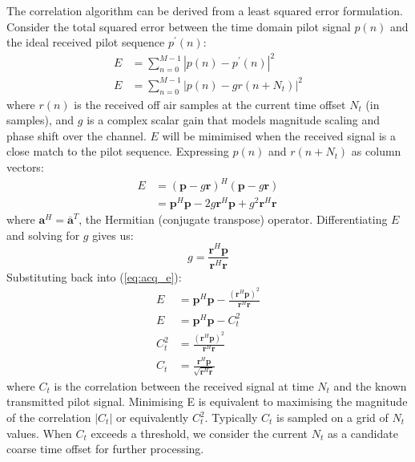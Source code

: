 \documentclass{article}
\begin{document}
The correlation algorithm can be derived from a least squared error formulation.  Consider the total squared error between the time domain pilot signal $p(n)$ and the ideal received pilot sequence $p^\prime(n)$:
\begin{equation}
\begin{split}
E &= \sum^{M-1}_{n=0} | p(n) - p^\prime(n) |^2 \\
E &= \sum^{M-1}_{n=0} | p(n) - gr(n+N_t)|^2
\end{split}
\end{equation}
where $r(n)$ is the received off air samples at the current time offset $N_{t}$  (in samples), and $g$ is a complex scalar gain that models magnitude scaling and phase shift over the channel.  $E$ will be mimimised when the received signal is a close match to the pilot sequence. Expressing $p(n)$ and $r(n+N_t)$ as column vectors:
\begin{equation}
\label{eq:acq_e}
\begin{split}
E &= (\bm{p}-g\bm{r})^H (\bm{p}-g\bm{r}) \\
  &= \bm{p}^H\bm{p} - 2g\bm{r}^H \bm{p} + g^2\bm{r}^H\bm{r}
\end{split}
\end{equation}
where $\bm{a}^H = \bm{\overline{a}}^T$, the Hermitian (conjugate transpose) operator. Differentiating $E$ and solving for $g$ gives us:
\begin{equation}
g = \frac{\bm{r}^H \bm{p}}{\bm{r}^H\bm{r}}
\end{equation}
Substituting back into (\ref{eq:acq_e}):
\begin{equation}
\label{eq:acq_corr}
\begin{split}
E &= \bm{p}^H\bm{p} - \frac{(\bm{r}^H \bm{p})^2}{\bm{r}^H\bm{r}} \\
E &= \bm{p}^H\bm{p} - C^2_t \\
C^2_t &= \frac{(\bm{r}^H \bm{p})^2}{\bm{r}^H\bm{r}} \\
C_t &= \frac{\bm{r}^H \bm{p}}{\sqrt{\bm{r}^H\bm{r}}}
\end{split}
\end{equation}
where $C_t$ is the correlation between the received signal at time $N_t$ and the known transmitted pilot signal. Minimising E is equivalent to maximising the magnitude of the correlation $|C_t|$ or equivalently $C^2_t$. Typically $C_t$ is sampled on a grid of $N_t$ values.  When $C_t$ exceeds a threshold, we consider the current $N_t$ as a candidate coarse time offset for further processing.
\end{document}
